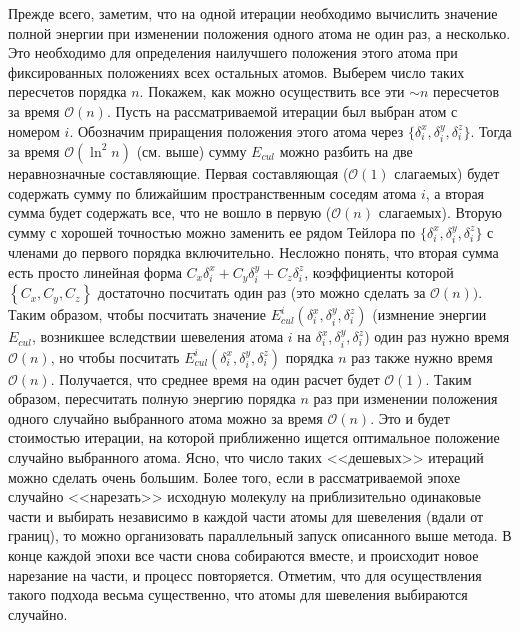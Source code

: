   Прежде всего, заметим, что на одной итерации необходимо вычислить значение полной энергии при изменении положения одного атома не один раз, а несколько. Это необходимо для определения наилучшего положения этого атома при фиксированных положениях всех остальных атомов. Выберем число таких пересчетов порядка $n$. Покажем, как можно осуществить все эти $\sim n$ пересчетов за время $\mathcal{O}\left( n \right)$. Пусть на рассматриваемой итерации был выбран атом с номером $i$. Обозначим приращения положения этого   атома через $\{\delta _i^x ,\delta _i^y ,\delta _i^z \}$. Тогда за время $\mathcal{O}\left( {\ln ^2n} \right)$ (см. выше) сумму $E_{cul}$ можно разбить на две 
  неравнозначные составляющие. Первая составляющая ($\mathcal{O}\left( 1 \right)$ 
  слагаемых) будет содержать сумму по ближайшим пространственным соседям атома 
  $i$, а вторая сумма будет содержать все, что не вошло в первую ($\mathcal{
  O}\left( n \right)$ слагаемых). Вторую сумму с хорошей точностью можно 
  заменить ее рядом Тейлора по $\{\delta _i^x ,\delta _i^y ,\delta _i^z \}$ с 
  членами до первого порядка включительно. 
  Несложно понять, что вторая сумма есть просто линейная форма 
  $C_x \delta _i^x + C_y \delta _i^y +C_z \delta _i^z $, коэффициенты которой 
  $\left\{ {C_x ,C_y ,C_z } \right\}$ достаточно посчитать один раз (это можно 
  сделать за $\mathcal{O}\left( n \right))$. Таким образом, чтобы посчитать 
  значение $E_{cul}^i \left( {\delta _i^x ,\delta _i^y ,\delta _i^z } 
  \right)$ (измнение энергии $E_{cul}$, возникшее вследствии шевеления атома $i$ на ${\delta _i^x ,\delta _i^y ,\delta _i^z }$) один раз нужно время $\mathcal{O}\left( n \right)$, но чтобы посчитать 
  $E_{cul}^i \left( {\delta _i^x ,\delta _i^y ,\delta _i^z } \right)$ порядка 
  $n$ раз также нужно время $\mathcal{O}\left( n \right)$. Получается, что среднее 
  время на один расчет будет $\mathcal{O}\left( 1 \right)$. Таким образом, 
  пересчитать полную энергию порядка $n$ раз при изменении положения одного 
  случайно выбранного атома можно за время $\mathcal{O}\left( 
  n \right)$. Это и будет стоимостью итерации, на которой приближенно ищется 
  оптимальное положение случайно выбранного атома. Ясно, что число таких 
  <<дешевых>> итераций можно сделать очень большим. Более того, если 
  в рассматриваемой эпохе случайно <<нарезать>> исходную молекулу на 
  приблизительно одинаковые части и выбирать независимо в каждой части атомы 
  для шевеления (вдали от границ), то можно организовать параллельный запуск 
  описанного выше метода. В конце каждой эпохи все части снова собираются 
  вместе, и происходит новое нарезание на части, и процесс повторяется. Отметим, что для осуществления такого подхода весьма существенно, что атомы для шевеления выбираются случайно. 


